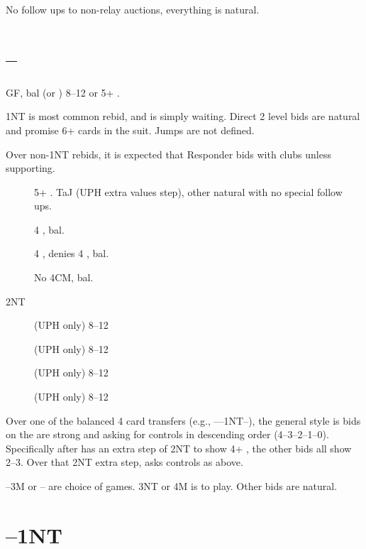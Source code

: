 \documentclass[tom-ari]{subfile}
\begin{document}
	No follow ups to non-relay auctions, everything is natural. 
	
	\section[1C--1S]{--}
	
	GF, bal (or ) 8--12 or 5+ \clubsuit.
	
	1NT is most common rebid, and is simply waiting.  Direct 2 level bids are natural and promise 6+ cards in the suit.   Jumps are not defined.
	
	Over non-1NT rebids, it is expected that Responder bids  with clubs unless supporting.
	
	\begin{bidbox}{}
		\begin{description}
		\item[] 5+ \clubsuit.   TaJ (UPH extra values step), other natural with no special follow ups. 
		\item[] 4 \heartsuit, bal. 
		\item[] 4 \spadesuit, denies 4 \heartsuit, bal. 
		\item[] No 4CM, bal.  
		\item[2NT]  (UPH only) 8--12 
		\item[]  (UPH only) 8--12
		\item[]  (UPH only) 8--12
		\item[]  (UPH only) 8--12
		\end{description}
	\end{bidbox}
	
	Over one of the balanced 4 card transfers (e.g., ----1NT--), the general style is bids on the  are strong and asking for controls in descending order (4--3--2--1--0).  Specifically  after  has an extra step of 2NT to show 4+ \spadesuit, the other bids all show 2--3.  Over that 2NT extra step,  asks controls as above.
	
	--3M or -- are choice of games.  3NT or 4M is to play. Other bids are natural. 


	\section[1C--1NT]{--1NT}
	
\end{document}
